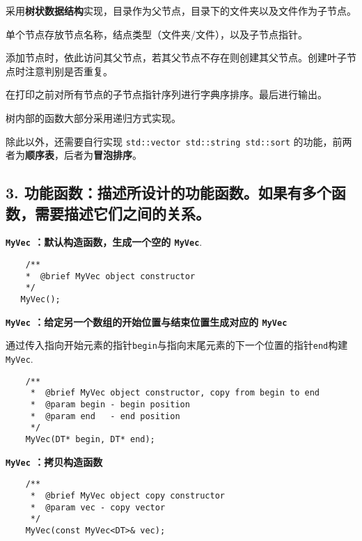 \documentclass[a4paper]{ctexart}
\begin{document}
采用\textbf{树状数据结构}实现，目录作为父节点，目录下的文件夹以及文件作为子节点。

单个节点存放节点名称，结点类型（文件夹/文件），以及子节点指针。

添加节点时，依此访问其父节点，若其父节点不存在则创建其父节点。创建叶子节点时注意判别是否重复。

在打印之前对所有节点的子节点指针序列进行字典序排序。最后进行输出。

树内部的函数大部分采用递归方式实现。

除此以外，还需要自行实现 \texttt{std::vector std::string std::sort} 的功能，前两者为\textbf{顺序表}，后者为\textbf{冒泡排序}。

\newpage
\subsection*{3. 功能函数：描述所设计的功能函数。如果有多个函数，需要描述它们之间的关系。}


\noindent \textbf{\texttt{MyVec} ：默认构造函数，生成一个空的 \texttt{MyVec}}.

\begin{lstlisting}
    /**
    *  @brief MyVec object constructor
    */
   MyVec();
\end{lstlisting}

\vspace{3em}

\noindent \textbf{\texttt{MyVec} ：给定另一个数组的开始位置与结束位置生成对应的 \texttt{MyVec}}

通过传入指向开始元素的指针\texttt{begin}与指向末尾元素的下一个位置的指针\texttt{end}构建\texttt{MyVec}.

\begin{lstlisting}
    /**
     *  @brief MyVec object constructor, copy from begin to end
     *  @param begin - begin position
     *  @param end   - end position
     */
    MyVec(DT* begin, DT* end);
\end{lstlisting}

\vspace{3em}

\noindent \textbf{\texttt{MyVec} ：拷贝构造函数}

\begin{lstlisting}
    /**
     *  @brief MyVec object copy constructor
     *  @param vec - copy vector
     */
    MyVec(const MyVec<DT>& vec);
\end{lstlisting}
\end{document}
